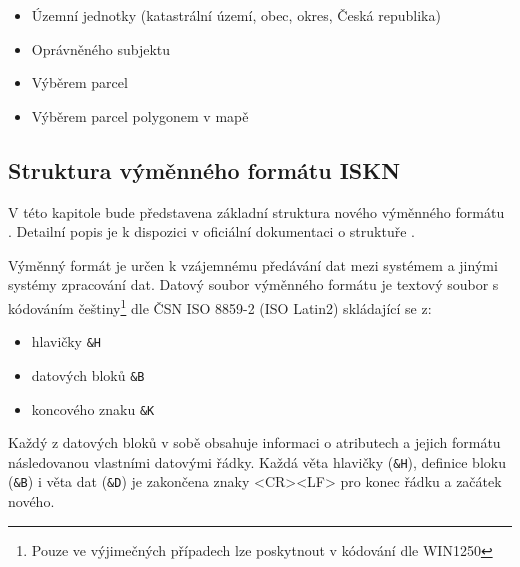 \begin{itemize}[leftmargin=50pt]
		\item Územní jednotky (katastrální území, obec, okres, Česká republika)
		\item Oprávněného subjektu
		\item Výběrem parcel
		\item Výběrem parcel polygonem v mapě
\end{itemize}
\subsection{Struktura výměnného formátu ISKN}
\label{sec:struktura_vfk}
V této kapitole bude představena základní struktura nového výměnného
formátu . Detailní popis je k dispozici v oficiální
dokumentaci o struktuře \cite{struktura_ISKN}.

Výměnný formát je určen k vzájemnému předávání dat mezi systémem
 a jinými systémy zpracování dat. Datový soubor výměnného
formátu je textový soubor s kódováním češtiny\footnote{Pouze ve
  výjimečných případech lze poskytnout v kódování dle WIN1250} dle ČSN
ISO 8859-2 (ISO Latin2) skládající se z:
\begin{itemize}[leftmargin=50pt]
		\item hlavičky \verb|&H|
		\item datových bloků \verb|&B|
		\item koncového znaku \verb|&K|
\end{itemize}

Každý z datových bloků v sobě obsahuje informaci o atributech a jejich formátu následovanou vlastními datovými řádky. Každá věta hlavičky (\verb|&H|), definice bloku (\verb|&B|) i věta dat (\verb|&D|) je zakončena znaky <CR><LF> pro konec řádku a začátek nového. %

